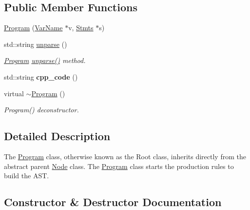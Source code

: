 \subsection*{Public Member Functions}
\begin{DoxyCompactItemize}
\item 
\hyperlink{classfcal_1_1ast_1_1Program_a317855d9155276333e1b47794d7b7305}{Program} (\hyperlink{classfcal_1_1ast_1_1VarName}{Var\+Name} $\ast$v, \hyperlink{classfcal_1_1ast_1_1Stmts}{Stmts} $\ast$s)
\item 
std\+::string \hyperlink{classfcal_1_1ast_1_1Program_a74fbea2311a77a1e53104350d50705a6}{unparse} ()
\begin{DoxyCompactList}\small\item\em \hyperlink{classfcal_1_1ast_1_1Program}{Program} \hyperlink{classfcal_1_1ast_1_1Program_a74fbea2311a77a1e53104350d50705a6}{unparse()} method. \end{DoxyCompactList}\item 
std\+::string {\bfseries cpp\+\_\+code} ()\hypertarget{classfcal_1_1ast_1_1Program_a1a3acfb2ff26b7d0cc90b11558214acd}{}\label{classfcal_1_1ast_1_1Program_a1a3acfb2ff26b7d0cc90b11558214acd}

\item 
virtual \hyperlink{classfcal_1_1ast_1_1Program_ace5f7fd3776c0620648d876b593d3acc}{$\sim$\+Program} ()
\begin{DoxyCompactList}\small\item\em Program() deconstructor. \end{DoxyCompactList}\end{DoxyCompactItemize}


\subsection{Detailed Description}
The \hyperlink{classfcal_1_1ast_1_1Program}{Program} class, otherwise known as the Root class, inherits directly from the abstract parent \hyperlink{classfcal_1_1ast_1_1Node}{Node} class. The \hyperlink{classfcal_1_1ast_1_1Program}{Program} class starts the production rules to build the A\+ST. 

\subsection{Constructor \& Destructor Documentation}
